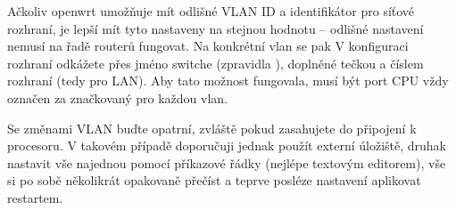 Ačkoliv \gls{openwrt} umožňuje mít odlišné VLAN ID a identifikátor pro síťové
rozhraní, je lepší mít tyto nastaveny na stejnou hodnotu -- odlišné nastavení
nemusí na řadě routerů fungovat. Na konkrétní \gls{vlan} se pak V konfiguraci
rozhraní odkážete přes jméno switche (zpravidla ), doplněné tečkou
a číslem rozhraní (tedy  pro LAN). Aby tato možnost fungovala, musí
být port CPU vždy označen za značkovaný pro každou \gls{vlan}.

Se změnami VLAN buďte opatrní, zvláště pokud zasahujete do připojení k procesoru.
V takovém případě doporučuji jednak použít externí úložiště, druhak nastavit
vše najednou pomocí příkazové řádky (nejlépe textovým editorem), vše si po sobě
několikrát opakovaně přečíst a teprve posléze nastavení aplikovat restartem.
